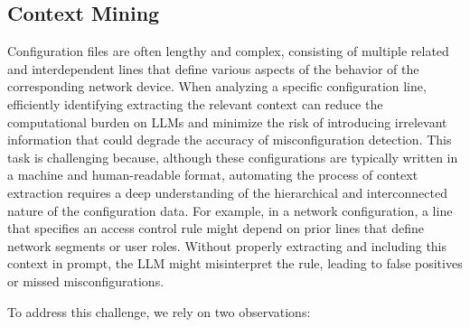 \subsection{Context Mining}\label{mining_method}  \label{challenge_1} Configuration files
are often lengthy and complex, consisting of multiple related and
interdependent lines that define various aspects of the behavior of the
corresponding network device. When
analyzing a specific configuration line, efficiently identifying
extracting the relevant context can reduce the computational burden on LLMs
and minimize the risk of introducing irrelevant information that could degrade
the accuracy of misconfiguration detection. This task is challenging because,
although these configurations are typically written in a machine and
human-readable format, automating the process of context extraction requires a
deep understanding of the hierarchical and interconnected nature of the
configuration data. For example, in a network configuration, a line that
specifies an access control rule might depend on prior lines that define
network segments or user roles. Without properly extracting and including this
context in prompt, the LLM might misinterpret the rule, leading to false
positives or missed misconfigurations.

To address this challenge, we rely on two observations:

